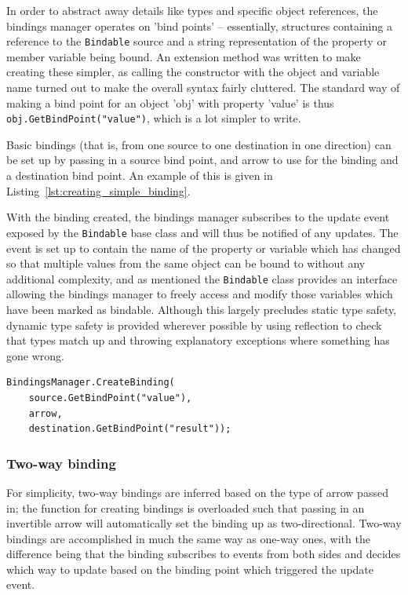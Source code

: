 \documentclass[12pt,twoside,notitlepage]{report}
\begin{document}
In order to abstract away details like types and specific object references, the bindings manager operates on 'bind points' -- essentially, structures containing a reference to the \texttt{Bindable} source and a string representation of the property or member variable being bound. An extension method was written to make creating these simpler, as calling the constructor with the object and variable name turned out to make the overall syntax fairly cluttered. The standard way of making a bind point for an object 'obj' with property 'value' is thus \texttt{obj.GetBindPoint("value")}, which is a lot simpler to write.

Basic bindings (that is, from one source to one destination in one direction) can be set up by passing in a source bind point, and arrow to use for the binding and a destination bind point. An example of this is given in Listing~\ref{lst:creating_simple_binding}.

With the binding created, the bindings manager subscribes to the update event exposed by the \texttt{Bindable} base class and will thus be notified of any updates. The event is set up to contain the name of the property or variable which has changed so that multiple values from the same object can be bound to without any additional complexity, and as mentioned the \texttt{Bindable} class provides an interface allowing the bindings manager to freely access and modify those variables which have been marked as bindable. Although this largely precludes static type safety, dynamic type safety is provided wherever possible by using reflection to check that types match up and throwing explanatory exceptions where something has gone wrong.

\begin{lstlisting}[language={[Sharp]C}, caption={Creating a binding between two properties}, label=lst:creating_simple_binding]
BindingsManager.CreateBinding(
	source.GetBindPoint("value"),
	arrow,
	destination.GetBindPoint("result"));
\end{lstlisting}

\subsubsection{Two-way binding}

For simplicity, two-way bindings are inferred based on the type of arrow passed in; the function for creating bindings is overloaded such that passing in an invertible arrow will automatically set the binding up as two-directional. Two-way bindings are accomplished in much the same way as one-way ones, with the difference being that the binding subscribes to events from both sides and decides which way to update based on the binding point which triggered the update event.
\end{document}
